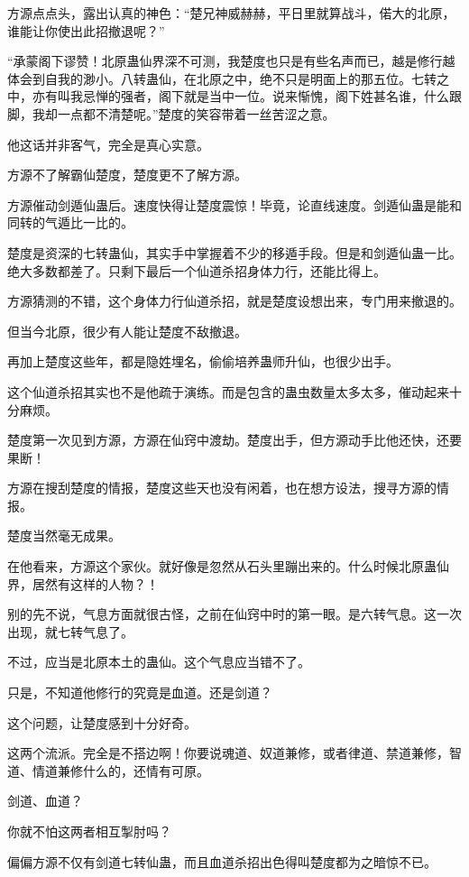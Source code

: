 \begin{this_body}
方源点点头，露出认真的神色：“楚兄神威赫赫，平日里就算战斗，偌大的北原，谁能让你使出此招撤退呢？”

“承蒙阁下谬赞！北原蛊仙界深不可测，我楚度也只是有些名声而已，越是修行越体会到自我的渺小。八转蛊仙，在北原之中，绝不只是明面上的那五位。七转之中，亦有叫我忌惮的强者，阁下就是当中一位。说来惭愧，阁下姓甚名谁，什么跟脚，我却一点都不清楚呢。”楚度的笑容带着一丝苦涩之意。

他这话并非客气，完全是真心实意。

方源不了解霸仙楚度，楚度更不了解方源。

方源催动剑遁仙蛊后。速度快得让楚度震惊！毕竟，论直线速度。剑遁仙蛊是能和同转的气遁比一比的。

楚度是资深的七转蛊仙，其实手中掌握着不少的移遁手段。但是和剑遁仙蛊一比。绝大多数都差了。只剩下最后一个仙道杀招身体力行，还能比得上。

方源猜测的不错，这个身体力行仙道杀招，就是楚度设想出来，专门用来撤退的。

但当今北原，很少有人能让楚度不敌撤退。

再加上楚度这些年，都是隐姓埋名，偷偷培养蛊师升仙，也很少出手。

这个仙道杀招其实也不是他疏于演练。而是包含的蛊虫数量太多太多，催动起来十分麻烦。

楚度第一次见到方源，方源在仙窍中渡劫。楚度出手，但方源动手比他还快，还要果断！

方源在搜刮楚度的情报，楚度这些天也没有闲着，也在想方设法，搜寻方源的情报。

楚度当然毫无成果。

在他看来，方源这个家伙。就好像是忽然从石头里蹦出来的。什么时候北原蛊仙界，居然有这样的人物？！

别的先不说，气息方面就很古怪，之前在仙窍中时的第一眼。是六转气息。这一次出现，就七转气息了。

不过，应当是北原本土的蛊仙。这个气息应当错不了。

只是，不知道他修行的究竟是血道。还是剑道？

这个问题，让楚度感到十分好奇。

这两个流派。完全是不搭边啊！你要说魂道、奴道兼修，或者律道、禁道兼修，智道、情道兼修什么的，还情有可原。

剑道、血道？

你就不怕这两者相互掣肘吗？

偏偏方源不仅有剑道七转仙蛊，而且血道杀招出色得叫楚度都为之暗惊不已。


\end{this_body}
